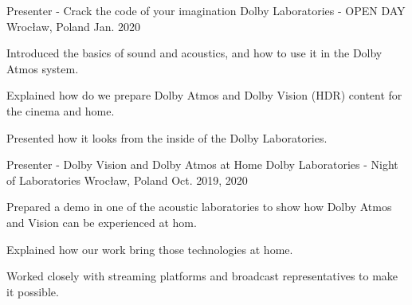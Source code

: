 

\begin{cventries}

  \cventry
    {Presenter - Crack the code of your imagination} %
    {Dolby Laboratories - OPEN DAY} %
    {Wrocław, Poland} %
    {Jan. 2020} %
    {
      \begin{cvitems} %
        \item {Introduced the basics of sound and acoustics, and how to use it in the Dolby Atmos system.}
        \item {Explained how do we prepare Dolby Atmos and Dolby Vision (HDR) content for the cinema and home.}
        \item {Presented how it looks from the inside of the Dolby Laboratories.}
      \end{cvitems}
    }

  \cventry
    {Presenter - Dolby Vision and Dolby Atmos at Home} %
    {Dolby Laboratories - Night of Laboratories} %
    {Wrocław, Poland} %
    {Oct. 2019, 2020} %
    {
      \begin{cvitems} %
        \item {Prepared a demo in one of the acoustic laboratories to show how Dolby Atmos and Vision can be experienced at hom.}
        \item {Explained how our work bring those technologies at home.}
        \item {Worked closely with streaming platforms and broadcast representatives to make it possible.}
      \end{cvitems}
    }

\end{cventries}
